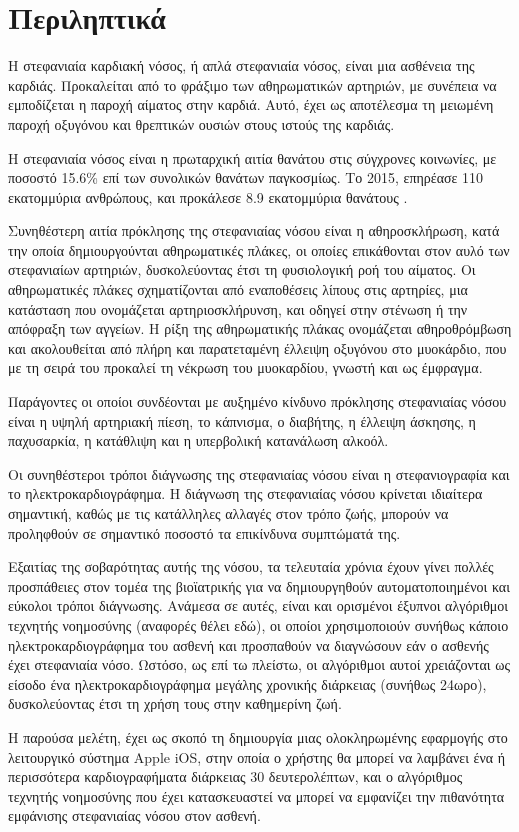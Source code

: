 \section{Περιληπτικά}

Η στεφανιαία καρδιακή νόσος, ή απλά στεφανιαία νόσος, είναι μια ασθένεια της καρδιάς. Προκαλείται από το φράξιμο των αθηρωματικών αρτηριών, με συνέπεια να εμποδίζεται η παροχή αίματος στην καρδιά. Αυτό, έχει ως αποτέλεσμα τη μειωμένη παροχή οξυγόνου και θρεπτικών ουσιών στους ιστούς της καρδιάς.

Η στεφανιαία νόσος είναι η πρωταρχική αιτία θανάτου στις σύγχρονες κοινωνίες, με ποσοστό 15.6\% επί των συνολικών θανάτων παγκοσμίως. Το 2015, επηρέασε 110 εκατομμύρια ανθρώπους, και προκάλεσε 8.9 εκατομμύρια θανάτους \cite{wikiCAD}.

Συνηθέστερη αιτία πρόκλησης της στεφανιαίας νόσου είναι η αθηροσκλήρωση, κατά την οποία δημιουργούνται αθηρωματικές πλάκες, οι οποίες επικάθονται στον αυλό των στεφανιαίων αρτηριών, δυσκολεύοντας έτσι τη φυσιολογική ροή του αίματος. Οι αθηρωματικές πλάκες σχηματίζονται από εναποθέσεις λίπους στις αρτηρίες, μια κατάσταση που ονομάζεται αρτηριοσκλήρυνση, και οδηγεί στην στένωση ή την απόφραξη των αγγείων. Η ρίξη της αθηρωματικής πλάκας ονομάζεται αθηροθρόμβωση και ακολουθείται από πλήρη και παρατεταμένη έλλειψη οξυγόνου στο μυοκάρδιο, που με τη σειρά του προκαλεί τη νέκρωση του μυοκαρδίου, γνωστή και ως έμφραγμα.

Παράγοντες οι οποίοι συνδέονται με αυξημένο κίνδυνο πρόκλησης στεφανιαίας νόσου είναι η υψηλή αρτηριακή πίεση, το κάπνισμα, ο διαβήτης, η έλλειψη άσκησης, η παχυσαρκία, η κατάθλιψη και η υπερβολική κατανάλωση αλκοόλ.

Οι συνηθέστεροι τρόποι διάγνωσης της στεφανιαίας νόσου είναι η στεφανιογραφία και το ηλεκτροκαρδιογράφημα. Η διάγνωση της στεφανιαίας νόσου κρίνεται ιδιαίτερα σημαντική, καθώς με τις κατάλληλες αλλαγές στον τρόπο ζωής, μπορούν να προληφθούν σε σημαντικό ποσοστό τα επικίνδυνα συμπτώματά της. \cite{abstract1, abstract2}

Εξαιτίας της σοβαρότητας αυτής της νόσου, τα τελευταία χρόνια έχουν γίνει πολλές προσπάθειες στον τομέα της βιοϊατρικής για να δημιουργηθούν αυτοματοποιημένοι και εύκολοι τρόποι διάγνωσης. Ανάμεσα σε αυτές, είναι και ορισμένοι έξυπνοι αλγόριθμοι τεχνητής νοημοσύνης (αναφορές θέλει εδώ), οι οποίοι χρησιμοποιούν συνήθως κάποιο ηλεκτροκαρδιογράφημα του ασθενή και προσπαθούν να διαγνώσουν εάν ο ασθενής έχει στεφανιαία νόσο. Ωστόσο, ως επί τω πλείστω, οι αλγόριθμοι αυτοί χρειάζονται ως είσοδο 
ένα ηλεκτροκαρδιογράφημα μεγάλης χρονικής διάρκειας (συνήθως 24ωρο), δυσκολεύοντας έτσι τη χρήση τους στην καθημερίνη ζωή.

Η παρούσα μελέτη, έχει ως σκοπό τη δημιουργία μιας ολοκληρωμένης εφαρμογής στο λειτουργικό σύστημα Apple iOS, στην οποία ο χρήστης θα μπορεί να λαμβάνει ένα ή περισσότερα καρδιογραφήματα διάρκειας 30 δευτερολέπτων, και ο αλγόριθμος τεχνητής νοημοσύνης που έχει κατασκευαστεί να μπορεί να εμφανίζει την πιθανότητα εμφάνισης στεφανιαίας νόσου στον ασθενή.